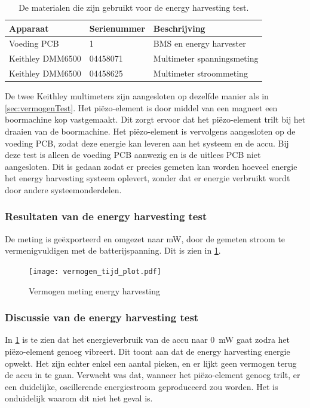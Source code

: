 \begin{table}[!htb]
    \centering
    \begin{tabular}{l|l|l}
        Apparaat         & Serienummer & Beschrijving \\
        \hline
        Voeding PCB      & 1           & BMS en energy harvester    \\
        Keithley DMM6500 & 04458071    & Multimeter spanningsmeting \\
        Keithley DMM6500 & 04458625    & Multimeter stroommeting    \\
        \hline
    \end{tabular}
    \caption{De materialen die zijn gebruikt voor de energy harvesting test.}
    \label{tab:testMaterialen4}
\end{table}

De twee Keithley multimeters zijn aangesloten op dezelfde manier als in \cref{sec:vermogenTest}. Het piëzo-element is door middel van een magneet een boormachine kop vastgemaakt. Dit zorgt ervoor dat het piëzo-element trilt bij het draaien van de boormachine. Het piëzo-element is vervolgens aangesloten op de voeding PCB, zodat deze energie kan leveren aan het systeem en de accu. Bij deze test is alleen de voeding PCB aanwezig en is de uitlees PCB niet aangesloten. Dit is gedaan zodat er precies gemeten kan worden hoeveel energie het energy harvesting systeem oplevert, zonder dat er energie verbruikt wordt door andere systeemonderdelen.

\subsubsection{Resultaten van de energy harvesting test}
De meting is geëxporteerd en omgezet naar mW, door de gemeten stroom te vermenigvuldigen met de batterijspanning. Dit is zien in \cref{fig:vermogenPlot}.

\begin{figure}[!htb]
    \centering
    \texttt{[image: vermogen\_tijd\_plot.pdf]}
    \caption{Vermogen meting energy harvesting}
    \label{fig:vermogenPlot}
\end{figure}

\subsubsection{Discussie van de energy harvesting test}
In \cref{fig:vermogenPlot} is te zien dat het energieverbruik van de accu naar \qty{0}{\milli\watt} gaat zodra het piëzo-element genoeg vibreert. Dit toont aan dat de energy harvesting energie opwekt. Het zijn echter enkel een aantal pieken, en er lijkt geen vermogen terug de accu in te gaan. Verwacht was dat, wanneer het piëzo-element genoeg trilt, er een duidelijke, oscillerende energiestroom geproduceerd zou worden. Het is onduidelijk waarom dit niet het geval is.